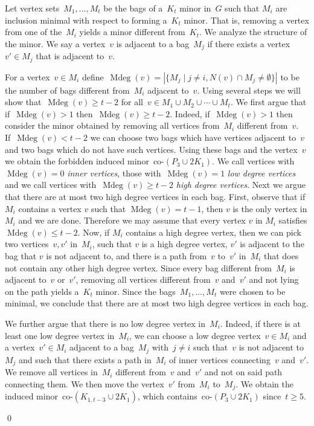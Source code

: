 \documentclass[envcountsame,envcountsect,11pt,a4paper]{llncs}
\renewenvironment{proof}{\begin{Proof}}{\qed\end{Proof}}
\DeclareMathOperator{\Mdeg}{Mdeg}
\begin{document}
\begin{proof}
Let vertex sets~$M_1,\ldots,M_t$ be the bags of a~$K_t$ minor in~$G$ such that $M_i$ are inclusion minimal with respect to forming a~$K_t$ minor. That is, removing a vertex from one of the~$M_i$ yields a minor different from~$K_t$.
We analyze the structure of the minor. We say a vertex~$v$ is adjacent to a bag~$M_j$ if there exists a vertex~$v'\in M_j$ that is adjacent to~$v$.

For a vertex~$v \in M_i$ define~$\Mdeg(v) = |\{M_j \mid j\neq i, N(v) \cap M_j \neq \emptyset\}|$ to be the number of bags different from~$M_i$ adjacent to~$v$.
Using several steps we will show that~$\Mdeg(v) \geq t-2$ for all~$v \in M_1\cup M_2\cup \cdots\cup M_t$.
We first argue that if~$\Mdeg(v) > 1$ then~$\Mdeg(v) \geq t-2$.
Indeed, if~$\Mdeg(v) > 1$ then consider the minor obtained by removing all vertices from~$M_i$ different from~$v$. If~$\Mdeg(v) <t-2$ we can
choose two bags which have vertices adjacent to~$v$ and two bags which do not have such vertices. Using these bags and the vertex~$v$ we
obtain the forbidden induced minor~co-$(P_{3} \cup 2 K_{1})$.
We call vertices with~$\Mdeg(v) = 0$ \emph{inner vertices}, those with~$\Mdeg(v)= 1$ \emph{low degree vertices} and we call vertices with~$\Mdeg(v) \geq t-2$ \emph{high degree vertices}.
Next we argue that there are at most two high degree vertices in each bag.
First, observe that if $M_i$ contains a vertex $v$ such that $\Mdeg(v)=t-1$, then $v$ is the only vertex in $M_i$ and we are done. Therefore
we may assume that every vertex $v$ in $M_i$ satisfies $\Mdeg(v) \leq t-2$.
Now, if $M_{i}$ contains a high degree vertex, then we can pick two vertices~$v,v'$ in~$M_i$,
such that $v$ is a high degree vertex, $v'$ is adjacent to the bag that $v$ is not adjacent to, and there
is a path from~$v$ to~$v'$ in~$M_i$ that does not contain any other high degree vertex.
Since every bag different from~$M_i$ is adjacent to~$v$ or~$v'$, removing all vertices different from~$v$ and~$v'$ and not lying on the path
yields a~$K_t$ minor. Since the bags~$M_1,\ldots,M_t$ were chosen to be minimal, we conclude that there are at most two high degree vertices
in each bag.
 
We further argue that there is no low degree vertex in~$M_i$.
Indeed, if there is at least one low degree vertex in~$M_i$, we can choose a low degree vertex~$v\in M_i$ and a vertex~$v'\in M_i$
adjacent to a bag~$M_j$ with~$j\neq i$ such that~$v$ is not adjacent to~$M_j$ and such that there exists a path in~$M_i$ of inner vertices
connecting~$v$ and~$v'$. We remove all vertices in~$M_i$ different from~$v$ and~$v'$ and not on said path connecting them. We then move the
vertex~$v'$ from~$M_i$ to~$M_j$. We obtain the induced minor~co-$(K_{1,t-3} \cup 2 K_{1})$, which contains~co-$(P_{3} \cup 2 K_{1})$
since~$t \ge 5$.


\end{proof}
\end{document}
